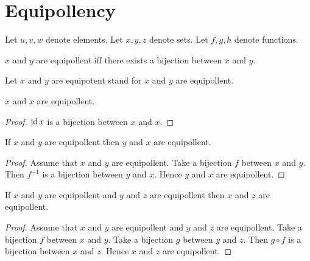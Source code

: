 \documentclass[../../basic-notions.ftl.tex]{subfiles}
\begin{document}
  \section{Equipollency}

  \begin{forthel}
  \end{forthel}

  \begin{forthel}
  Let $u,v,w$ denote elements.
  Let $x,y,z$ denote sets.
  Let $f,g,h$ denote functions.
  \end{forthel}


  \begin{forthel}
    \begin{definition}
      $x$ and $y$ are equipollent iff there exists a bijection between $x$ and $y$.
    \end{definition}

    Let $x$ and $y$ are equipotent stand for $x$ and $y$ are equipollent.

    \begin{proposition}\label{SetTheory_02_06_639059}
      $x$ and $x$ are equipollent.
    \end{proposition}
    \begin{proof}
      $\operatorname{id}{x}$ is a bijection between $x$ and $x$.
    \end{proof}

    \begin{proposition}\label{SetTheory_02_06_467393}
      If $x$ and $y$ are equipollent then $y$ and $x$ are equipollent.
    \end{proposition}
    \begin{proof}
      Assume that $x$ and $y$ are equipollent.
      Take a bijection $f$ between $x$ and $y$.
      Then $f^{-1}$ is a bijection between $y$ and $x$.
      Hence $y$ and $x$ are equipollent.
    \end{proof}

    \begin{proposition}\label{SetTheory_02_06_956273}
      If $x$ and $y$ are equipollent and $y$ and $z$ are equipollent then $x$ and $z$ are equipollent.
    \end{proposition}
    \begin{proof}
      Assume that $x$ and $y$ are equipollent and $y$ and $z$ are equipollent.
      Take a bijection $f$ between $x$ and $y$.
      Take a bijection $g$ between $y$ and $z$.
      Then $g \circ f$ is a bijection between $x$ and $z$.
      Hence $x$ and $z$ are equipollent.
    \end{proof}


\end{forthel}
\end{document}
